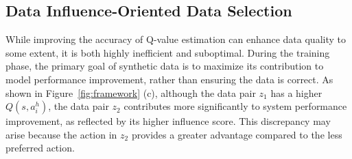 
\subsection{Data Influence-Oriented Data Selection}
\label{subsection:hybrid data selection}


While improving the accuracy of Q-value estimation can enhance data quality to some extent, it is both highly inefficient and suboptimal. During the training phase, the primary goal of synthetic data is to maximize its contribution to model performance improvement, rather than ensuring the data is correct. As shown in Figure~\ref{fig:framework} (c), although the data pair $z_1$ has a higher $Q(s,a_i^h)$, the data pair $z_2$ contributes more significantly to system performance improvement, as reflected by its higher influence score. This discrepancy may arise because the action in $z_2$ provides a greater advantage compared to the less preferred action.

